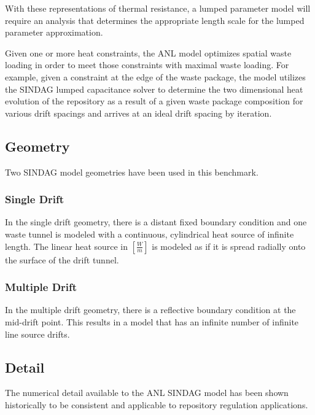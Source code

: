 \documentclass{anstrans}
\begin{document}
With these representations of thermal resistance, a lumped parameter model will 
require an analysis that determines the appropriate length scale for the lumped 
parameter approximation.

Given one or more heat constraints, the \gls{ANL}  model  optimizes spatial 
waste loading in order to meet those constraints with maximal waste loading. For 
example, given a constraint at the edge of the waste package, the model utilizes 
the \gls{SINDAG} lumped capacitance solver to determine the two dimensional heat 
evolution of the repository as a result of a given waste package composition for 
various drift spacings and arrives at an ideal drift spacing by iteration.

\subsection{Geometry}

Two \gls{SINDAG} model geometries have been used in this benchmark.  

\subsubsection{Single Drift}

In the single drift geometry, there is a distant fixed boundary condition and 
one waste tunnel is modeled with a continuous, cylindrical heat source of 
infinite length. The linear heat source in $[\frac{W}{m}]$ is modeled as if it 
is spread radially onto the surface of the drift tunnel. 

\subsubsection{Multiple Drift}

In the multiple drift geometry, there is a reflective boundary condition at the 
mid-drift point. This results in a model that has an infinite number of infinite 
line source drifts.

\subsection{Detail}

The numerical detail available to the \gls{ANL} \gls{SINDAG} model has been 
shown historically to be consistent and applicable to repository regulation 
applications.



\end{document}
